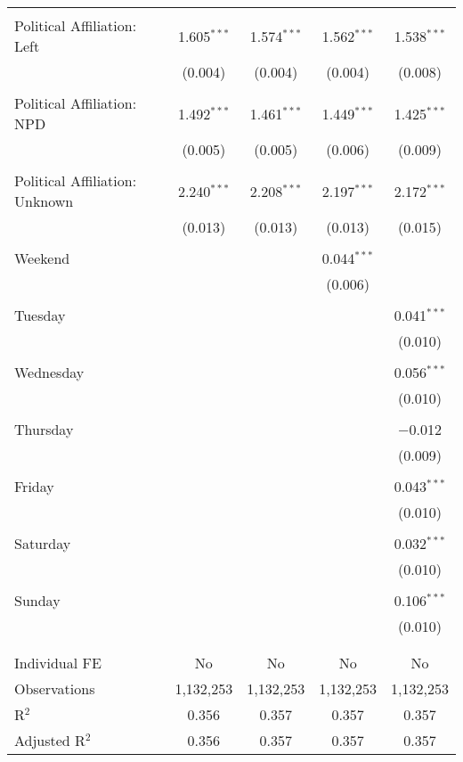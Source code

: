 \documentclass[
]{article}
\begin{document}
\begin{table}[!htbp]
{\begin{tabular}{@{\extracolsep{5pt}}lcccc}
  & & & & \\ 
 Political Affiliation: Left & 1.605$^{***}$ & 1.574$^{***}$ & 1.562$^{***}$ & 1.538$^{***}$ \\ 
  & (0.004) & (0.004) & (0.004) & (0.008) \\ 
  & & & & \\ 
 Political Affiliation: NPD & 1.492$^{***}$ & 1.461$^{***}$ & 1.449$^{***}$ & 1.425$^{***}$ \\ 
  & (0.005) & (0.005) & (0.006) & (0.009) \\ 
  & & & & \\ 
 Political Affiliation: Unknown & 2.240$^{***}$ & 2.208$^{***}$ & 2.197$^{***}$ & 2.172$^{***}$ \\ 
  & (0.013) & (0.013) & (0.013) & (0.015) \\ 
  & & & & \\ 
 Weekend &  &  & 0.044$^{***}$ &  \\ 
  &  &  & (0.006) &  \\ 
  & & & & \\ 
 Tuesday &  &  &  & 0.041$^{***}$ \\ 
  &  &  &  & (0.010) \\ 
  & & & & \\ 
 Wednesday &  &  &  & 0.056$^{***}$ \\ 
  &  &  &  & (0.010) \\ 
  & & & & \\ 
 Thursday &  &  &  & $-$0.012 \\ 
  &  &  &  & (0.009) \\ 
  & & & & \\ 
 Friday &  &  &  & 0.043$^{***}$ \\ 
  &  &  &  & (0.010) \\ 
  & & & & \\ 
 Saturday &  &  &  & 0.032$^{***}$ \\ 
  &  &  &  & (0.010) \\ 
  & & & & \\ 
 Sunday &  &  &  & 0.106$^{***}$ \\ 
  &  &  &  & (0.010) \\ 
  & & & & \\ 
\hline \\[-1.8ex] 
Individual FE & No & No & No & No \\ 
Observations & 1,132,253 & 1,132,253 & 1,132,253 & 1,132,253 \\ 
R$^{2}$ & 0.356 & 0.357 & 0.357 & 0.357 \\ 
Adjusted R$^{2}$ & 0.356 & 0.357 & 0.357 & 0.357 \\ 

\end{tabular}}
\end{table}
\end{document}
